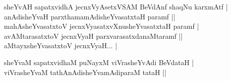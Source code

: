 \begin{entry}
\medskip
\begin{shl}
sheYvAH sapatxvidhA jecnxVyAsetxVSAM BeVdAnf shaqNu karxmAtf |\\[2pt]
anAdisheYvaH parxthamamAdisheYvasatxtaH paramf ||\\[2pt]
mahAsheYvasatxtoV jecnxVyasatxvXnusheYvasatxtaH paramf |\\[2pt]
avAMtarasatxtoV jecnxVyaH parxvarasatxdanaMtaramf ||\\[2pt]
aMtayxsheYvasatxtoV jecnxVyaH... |\\[-1pt]
\end{shl}
\medskip
{}
\medskip
{}
\medskip
\begin{shl}
sheYvaM sapatxvidhaM puNayxM viVrasheYvAdi BeVdataH |\\[2pt]
viVrasheYvaM tathAnAdisheYvamAdiparaM tataH ||
\end{shl}

\eject


\end{entry}
